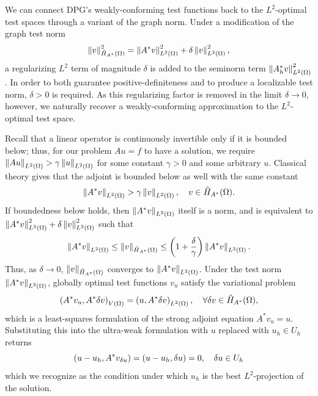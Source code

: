 We can connect DPG's weakly-conforming test functions back to the $L^2$-optimal test spaces through a variant of the graph norm.  Under a modification of the graph test norm
\[
\nor{v}_{\tilde{H}_{A^*}(\Omega)}^2 = \nor{A^*v}_{\L}^2 + \delta \nor{v}_{\L}^2,
\]
a regularizing $L^2$ term of magnitude $\delta$ is added to the seminorm term $\nor{A_h^*v}_{\L}^2$.  In order to both guarantee positive-definiteness and to produce a localizable test norm, $\delta > 0$ is required.  As this regularizing factor is removed in the limit $\delta \rightarrow 0$, however, we naturally recover a weakly-conforming approximation to the $L^2$-optimal test space.  

Recall that a linear operator is continuously invertible only if it is bounded below; thus, for our problem $Au=f$ to have a solution, we require $\nor{Au}_{\L} > \gamma\nor{u}_{\L}$ for some constant $\gamma > 0$ and some arbitrary $u$.  Classical theory gives that the adjoint is bounded below as well with the same constant
\[
\nor{A^*v}_{\L} > \gamma\nor{v}_{\L}, \quad v\in \tilde{H}_{A^*}(\Omega).
\]
If boundedness below holds, then $\nor{A^*v}_{\L}$ itself is a norm, and is equivalent to $\nor{A^*v}_{\L}^2 + \delta \nor{v}_{\L}^2$ such that
\[
\nor{A^*v}_{\L} \leq \nor{v}_{\tilde{H}_{A^*}(\Omega)} \leq \LRp{1+\frac{\delta}{\gamma}}\nor{A^*v}_{\L}.
\]
Thus, as $\delta \rightarrow 0$, $\nor{v}_{\tilde{H}_{A^*}(\Omega)}$ converges to $\nor{A^*v}_{\L}$.  Under the test norm $\nor{A^*v}_{\L}$, globally optimal test functions $v_u$ satisfy the variational problem
\[
\LRp{A^* v_u, A^* \delta v}_{V(\Omega)} = \LRp{u,A^* \delta v}_{L^2(\Omega)}, \quad \forall \delta v \in \tilde{H}_{A^*}(\Omega),
\]
which is a least-squares formulation of the strong adjoint equation $A^* v_u = u$.  Substituting this into the ultra-weak formulation with $u$ replaced with $u_h\in U_h$ returns
\[
\LRp{u-u_h,A^*v_{\delta u}} = \LRp{u-u_h,\delta u} = 0, \quad \delta u \in U_h
\]
which we recognize as the condition under which $u_h$ is the best $L^2$-projection of the solution.  

